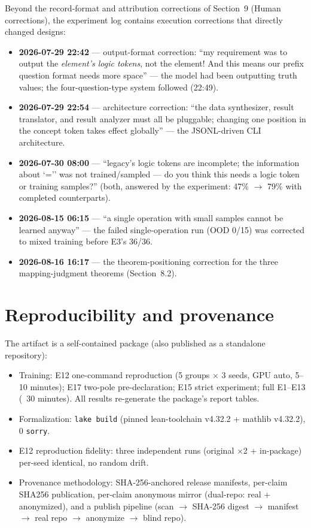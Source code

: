 \documentclass[sigplan,10pt,anonymous,review]{acmart}
\begin{document}
Beyond the record-format and attribution corrections of
Section~9 (Human corrections), the experiment log contains execution
corrections that directly changed designs:

\begin{itemize}
\item \textbf{2026-07-29 22:42} --- output-format correction: ``my
requirement was to output the \emph{element's logic tokens}, not the
element! And this means our prefix question format needs more space'' ---
the model had been outputting truth values; the four-question-type system
followed (22:49).
\item \textbf{2026-07-29 22:54} --- architecture correction: ``the data
synthesizer, result translator, and result analyzer must all be
pluggable; changing one position in the concept token takes effect
globally'' --- the JSONL-driven CLI architecture.
\item \textbf{2026-07-30 08:00} --- ``legacy's logic tokens are incomplete;
the information about `='' was not trained/sampled --- do you think this
needs a logic token or training samples?'' (both, answered by the
experiment: 47\% $\to$ 79\% with completed counterparts).
\item \textbf{2026-08-15 06:15} --- ``a single operation with small
samples cannot be learned anyway'' --- the failed single-operation run
(OOD 0/15) was corrected to mixed training before E3's 36/36.
\item \textbf{2026-08-16 16:17} --- the theorem-positioning correction for
the three mapping-judgment theorems (Section~8.2).
\end{itemize}

\section{Reproducibility and provenance}

The artifact is a self-contained package (also published as a standalone
repository):
\begin{itemize}
\item Training: E12 one-command reproduction (5 groups $\times$ 3 seeds,
GPU auto, 5--10 minutes); E17 two-pole pre-declaration; E15 strict
experiment; full E1--E13 (~30 minutes). All results re-generate the
package's report tables.
\item Formalization: \texttt{lake build} (pinned lean-toolchain
v4.32.2 + mathlib v4.32.2), 0 \texttt{sorry}.
\item E12 reproduction fidelity: three independent runs (original $\times$2 +
in-package) per-seed identical, no random drift.
\item Provenance methodology: SHA-256-anchored release manifests, per-claim
SHA256 publication, per-claim anonymous mirror (dual-repo: real +
anonymized), and a publish pipeline (scan $\to$ SHA-256 digest $\to$ manifest $\to$
real repo $\to$ anonymize $\to$ blind repo).
\end{itemize}
\end{document}
